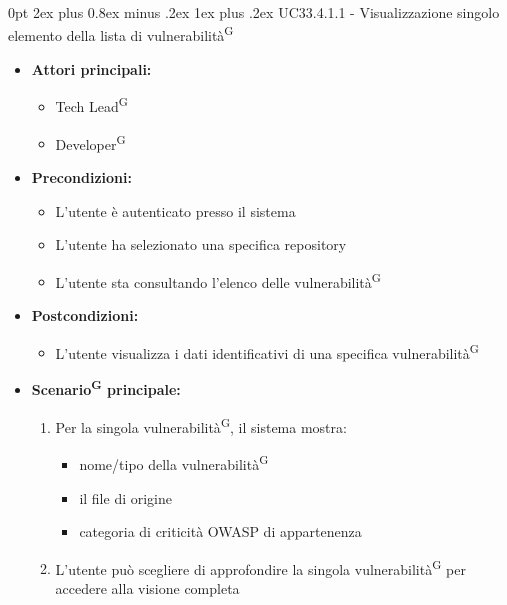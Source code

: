 \documentclass[a4paper, 11pt]{article}
\makeatletter
\renewcommand\subparagraph{\@startsection{subparagraph}{5}
  {0pt}
  {2ex plus 0.8ex minus .2ex}
  {1ex plus .2ex}
  {\normalfont\normalsize\bfseries\color{AccentColor}}}
\makeatother
\begin{document}
\subparagraph{UC33.4.1.1 - Visualizzazione singolo elemento della lista di vulnerabilità\textsuperscript{G}}\label{UC33.4.1.1}
\begin{itemize}
    \item \textbf{Attori principali:}
    \begin{itemize}
        \item Tech Lead\textsuperscript{G}
        \item Developer\textsuperscript{G}
    \end{itemize}
    \item \textbf{Precondizioni:}
    \begin{itemize}
        \item L'utente è autenticato presso il sistema
        \item L’utente ha selezionato una specifica repository
        \item L'utente sta consultando l'elenco delle vulnerabilità\textsuperscript{G}
    \end{itemize}
    \item \textbf{Postcondizioni:}
    \begin{itemize}
        \item L'utente visualizza i dati identificativi di una specifica vulnerabilità\textsuperscript{G}
    \end{itemize}
    \item \textbf{Scenario\textsuperscript{G} principale:}
    \begin{enumerate}
        \item Per la singola vulnerabilità\textsuperscript{G}, il sistema mostra:
            \begin{itemize}
                \item nome/tipo della vulnerabilità\textsuperscript{G}
                \item il file di origine
                \item categoria di criticità OWASP di appartenenza
            \end{itemize}
        \item L'utente può scegliere di approfondire la singola vulnerabilità\textsuperscript{G} per accedere alla visione completa
    \end{enumerate}
\end{itemize}
\end{document}
